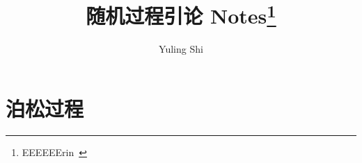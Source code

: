 \documentclass[10pt]{yerbaformat}
\title{随机过程引论 Notes\footnote{EEEEEErin~}}
\date{}
\begin{document}
\author{Yuling Shi}
\maketitle
\footnotesize





\section{泊松过程}
\end{document}

